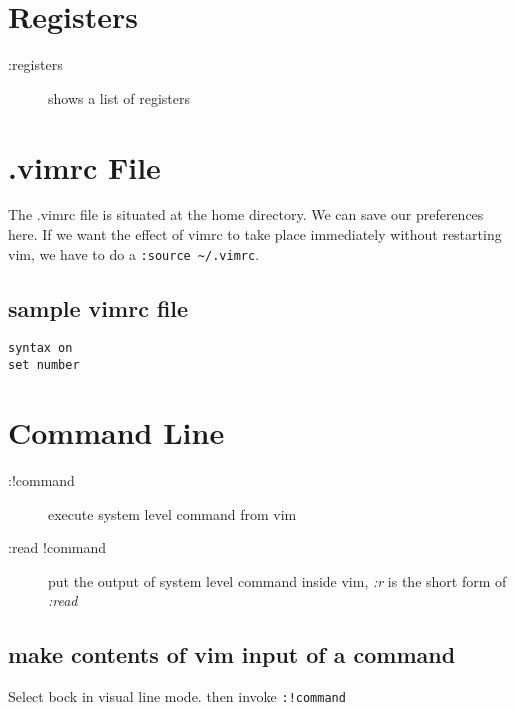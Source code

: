 \documentclass[a4paper, 12pt]{article}
\begin{document}
\section{Registers}
\begin{description}
	\item[:registers] shows a list of registers	
\end{description}

\section{.vimrc File}
The .vimrc file is situated at the home directory. We can save our preferences here. If we want the effect of vimrc to take place immediately without restarting vim, we have to do a \verb|:source ~/.vimrc|.

\subsection{sample vimrc file}
\begin{verbatim}
syntax on
set number
\end{verbatim}

\section{Command Line}
\begin{description}
	\item[:!command] execute system level command from vim	
	\item[:read !command] put the output of system level command inside vim, \emph{:r} is the short form of \emph{:read}
\end{description}

\subsection{make contents of vim input of a command}
Select bock in visual line mode. then invoke \verb|:!command|
\end{document}
